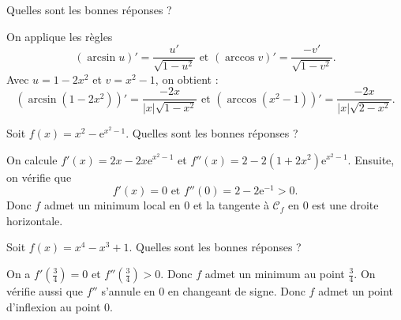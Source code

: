 \begin{question}

Quelles sont les bonnes réponses ?
\begin{answers}
\end{answers}
\begin{explanations}
On applique les règles
$$(\arcsin u)'=\frac{u'}{\sqrt{1-u^2}}\mbox{ et }(\arccos v)'=\frac{-v'}{\sqrt{1-v^2}}.$$
Avec $u=1-2x^2$ et $v=x^2-1$, on obtient :
$$(\arcsin (1-2x^2))'=\frac{-2x}{|x|\sqrt{1-x^2}}\mbox{ et }(\arccos (x^2-1))'=\frac{-2x}{|x|\sqrt{2-x^2}}.$$
\end{explanations}
\end{question}



\begin{question}

Soit $\displaystyle f(x)=x^2-\mathrm{e}^{x^2-1}$. Quelles sont les bonnes réponses ?
\begin{answers}  
\end{answers}
\begin{explanations}
On calcule $f'(x)=2x-2x\mathrm{e}^{x^2-1}$ et $f''(x)=2-2(1+2x^2)\mathrm{e}^{x^2-1}$. Ensuite, on vérifie que
$$f'(x)=0\mbox{ et }f''(0)=2-2\mathrm{e}^{-1}>0.$$
Donc $f$ admet un minimum local en $0$ et la tangente à $\mathscr{C}_f$ en $0$ est une droite horizontale.
\end{explanations}
\end{question}



\begin{question}

Soit $\displaystyle f(x)=x^4-x^3+1$. Quelles sont les bonnes réponses ?
\begin{answers}  
\end{answers}
\begin{explanations}
On a $f'\left(\frac{3}{4}\right)=0$ et $f''\left(\frac{3}{4}\right)>0$. Donc $f$ admet un minimum au point $\displaystyle \frac{3}{4}$. On vérifie aussi que $f''$ s'annule en $0$ en changeant de signe. Donc $f$ admet un point d'inflexion au point $0$.
\end{explanations}
\end{question}





